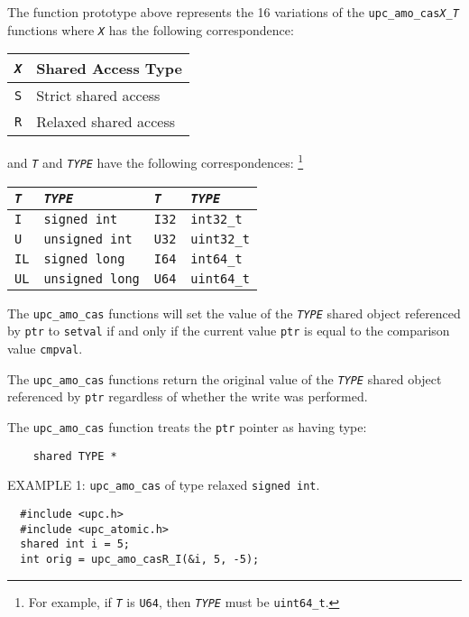 \np The function prototype above represents the 16 variations of the
    {\tt upc\_amo\_cas{\em X}\_{\em T}} functions where {\tt{\em X}} has the
    following correspondence:
\begin{center}
\begin{tabular}{ll}
{\tt{\em X}} & {Shared Access Type} \\ \hline
{\tt S} & {Strict shared access} \\
{\tt R} & {Relaxed shared access} \\
\end{tabular}
\end{center}
    and {\tt{\em T}} and {\tt{\em TYPE}} have the following correspondences:
    \footnote{For example, if {\tt{\em T}} is {\tt U64}, then 
    {\tt{\em TYPE}} must be {\tt uint64\_t}.}
\begin{center}
\begin{tabular}{ll|ll}
{\tt{\em T}} & {\tt{\em TYPE}} \hspace*{1.5in} &
{\tt{\em T}} & {\tt{\em TYPE}} \\ \hline
{\tt I} & {\tt signed int} &
{\tt I32} & {\tt int32\_t} \\
{\tt U} & {\tt unsigned int} &
{\tt U32} & {\tt uint32\_t} \\
{\tt IL} & {\tt signed long} &
{\tt I64} & {\tt int64\_t} \\
{\tt UL} & {\tt unsigned long} &
{\tt U64} & {\tt uint64\_t} \\
\end{tabular}
\end{center}

\np The {\tt upc\_amo\_cas} functions will set the value of the {\tt{\em TYPE}}
    shared object referenced by {\tt ptr} to {\tt setval} if and only if
    the current value {\tt *ptr} is equal to the comparison value {\tt cmpval}.

\np The {\tt upc\_amo\_cas} functions return the original value of the
    {\tt{\em TYPE}} shared object referenced by {\tt ptr} regardless of whether
    the write was performed.

\np The {\tt upc\_amo\_cas} function treats the {\tt ptr} pointer as having
    type:
\begin{verbatim}
    shared TYPE *
\end{verbatim}

\np EXAMPLE 1: {\tt upc\_amo\_cas} of type relaxed {\tt signed int}.
\begin{verbatim}
  #include <upc.h>
  #include <upc_atomic.h>
  shared int i = 5;
  int orig = upc_amo_casR_I(&i, 5, -5);
\end{verbatim}


